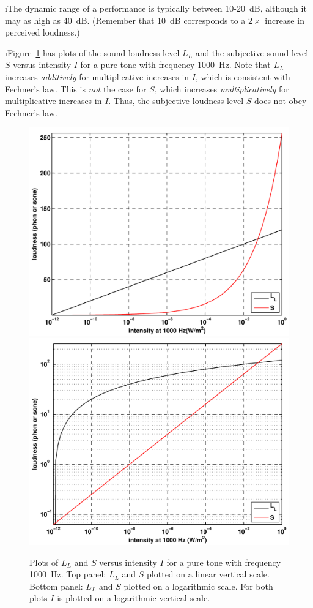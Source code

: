 \i The dynamic range of a performance 
is typically between 10-20~dB, 
although it may as high as 40~dB.
(Remember that 10~dB corresponds to a $2\times$
increase in perceived loudness.)

\i Figure~\ref{f:loudness} has plots of the sound loudness
level $L_L$ and the subjective sound level $S$ versus 
intensity $I$ for a pure tone with frequency 1000~Hz.
Note that $L_L$ increases {\em additively} for
multiplicative increases in $I$,
which is consistent with Fechner's law.
This is {\em not} the case for $S$, 
which increases {\em multiplicatively} for 
multiplicative increases in $I$.
Thus, the subjective loudness level $S$ does not obey Fechner's law.
%
\begin{figure}[htbp]
\begin{center}
\includegraphics[width=.6\textwidth]{loudness-semilog}
\includegraphics[width=.6\textwidth]{loudness-loglog}
\caption{Plots of $L_L$ and $S$ versus intensity $I$ 
for a pure tone with frequency 1000~Hz.
Top panel: $L_L$ and $S$ plotted on a linear vertical scale.
Bottom panel: $L_L$ and $S$ plotted on a logarithmic scale.
For both plots $I$ is plotted on a logarithmic vertical scale.}
\label{f:loudness}
\end{center}
\end{figure}
%


